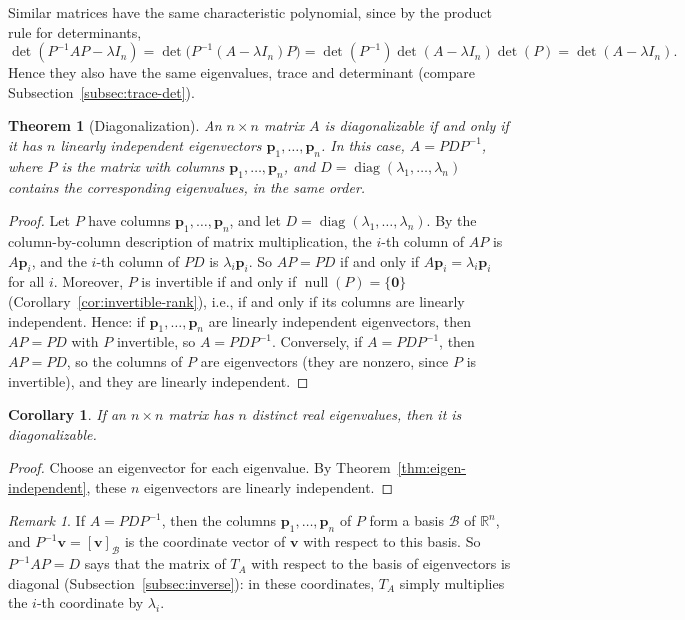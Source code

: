 \documentclass[11pt]{article}
\theoremstyle{definition}
\theoremstyle{plain}
\newtheorem{theorem}[definition]{Theorem}
\newtheorem{corollary}[definition]{Corollary}
\theoremstyle{remark}
\newtheorem{remark}[definition]{Remark}
\DeclareMathOperator{\Null}{null}
\DeclareMathOperator{\diag}{diag}
\begin{document}
Similar matrices have the same characteristic polynomial, since by the product rule for determinants,
\[\det(P^{-1}AP - \lambda I_n) = \det\big(P^{-1}(A - \lambda I_n)P\big) = \det(P^{-1})\det(A - \lambda I_n)\det(P) = \det(A - \lambda I_n).\]
Hence they also have the same eigenvalues, trace and determinant (compare Subsection~\ref{subsec:trace-det}).

\begin{theorem}[Diagonalization]\label{thm:diagonalization}
    An $n \times n$ matrix $A$ is diagonalizable if and only if it has $n$ linearly independent eigenvectors $\mathbf{p}_1, \ldots, \mathbf{p}_n$. In this case, $A = PDP^{-1}$, where $P$ is the matrix with columns $\mathbf{p}_1, \ldots, \mathbf{p}_n$, and $D = \diag(\lambda_1, \ldots, \lambda_n)$ contains the corresponding eigenvalues, in the same order.
\end{theorem}

\begin{proof}
    Let $P$ have columns $\mathbf{p}_1, \ldots, \mathbf{p}_n$, and let $D = \diag(\lambda_1, \ldots, \lambda_n)$. By the column-by-column description of matrix multiplication, the $i$-th column of $AP$ is $A\mathbf{p}_i$, and the $i$-th column of $PD$ is $\lambda_i \mathbf{p}_i$. So $AP = PD$ if and only if $A\mathbf{p}_i = \lambda_i \mathbf{p}_i$ for all $i$. Moreover, $P$ is invertible if and only if $\Null(P) = \{\mathbf{0}\}$ (Corollary~\ref{cor:invertible-rank}), i.e., if and only if its columns are linearly independent. Hence: if $\mathbf{p}_1, \ldots, \mathbf{p}_n$ are linearly independent eigenvectors, then $AP = PD$ with $P$ invertible, so $A = PDP^{-1}$. Conversely, if $A = PDP^{-1}$, then $AP = PD$, so the columns of $P$ are eigenvectors (they are nonzero, since $P$ is invertible), and they are linearly independent.
\end{proof}

\begin{corollary}\label{cor:distinct-eigenvalues}
    If an $n \times n$ matrix has $n$ distinct real eigenvalues, then it is diagonalizable.
\end{corollary}

\begin{proof}
    Choose an eigenvector for each eigenvalue. By Theorem~\ref{thm:eigen-independent}, these $n$ eigenvectors are linearly independent.
\end{proof}

\begin{remark}
    If $A = PDP^{-1}$, then the columns $\mathbf{p}_1, \ldots, \mathbf{p}_n$ of $P$ form a basis $\mathcal{B}$ of $\mathbb{R}^n$, and $P^{-1}\mathbf{v} = [\mathbf{v}]_{\mathcal{B}}$ is the coordinate vector of $\mathbf{v}$ with respect to this basis. So $P^{-1}AP = D$ says that the matrix of $T_A$ with respect to the basis of eigenvectors is diagonal (Subsection~\ref{subsec:inverse}): in these coordinates, $T_A$ simply multiplies the $i$-th coordinate by $\lambda_i$.
\end{remark}
\end{document}
